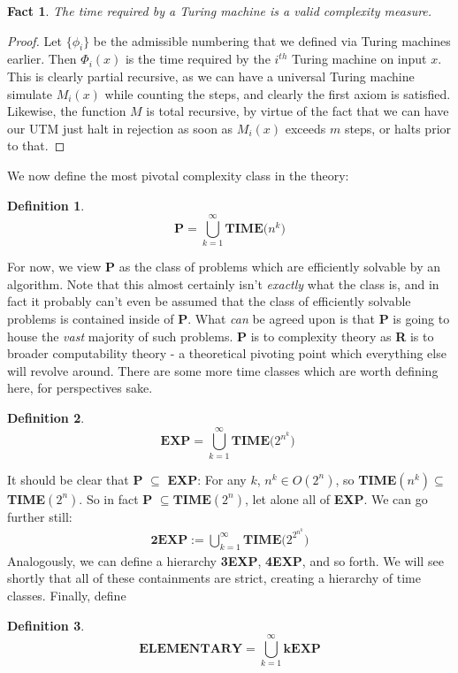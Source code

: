 \documentclass{article}
\theoremstyle{definition}
\newtheorem{definition}{Definition}[section]
\theoremstyle{plain}
\theoremstyle{theorem}
\newtheorem{fact}{Fact}[section]
\begin{document}
\begin{fact}
    The time required by a Turing machine is a valid complexity measure.
\end{fact}
\begin{proof}
    Let $\{\phi_i\}$ be the admissible numbering that we defined via Turing machines earlier. Then $\Phi_i(x)$ is the time required by the $i^{th}$ Turing machine on input $x$. This is clearly partial recursive, as we can have a universal Turing machine simulate $M_i(x)$ while counting the steps, and clearly the first axiom is satisfied. Likewise, the function $M$ is total recursive, by virtue of the fact that we can have our UTM just halt in rejection as soon as $M_i(x)$ exceeds $m$ steps, or halts prior to that.
\end{proof}
We now define the most pivotal complexity class in the theory:
\begin{definition}
\[ \textbf{P} = \bigcup_{k=1}^\infty \textbf{TIME($n^k$)} \]
\end{definition}
For now, we view \textbf{P} as the class of problems which are efficiently solvable by an algorithm. Note that this almost certainly isn't \textit{exactly} what the class is, and in fact it probably can't even be assumed that the class of efficiently solvable problems is contained inside of \textbf{P}. What \textit{can} be agreed upon is that \textbf{P} is going to house the \textit{vast} majority of such problems. \textbf{P} is to complexity theory as \textbf{R} is to broader computability theory - a theoretical pivoting point which everything else will revolve around. There are some more time classes which are worth defining here, for perspectives sake. 
\begin{definition}
\[ \textbf{EXP} =  \bigcup_{k=1}^\infty \textbf{TIME($2^{n^k}$) } \]
\end{definition}
It should be clear that \textbf{P} $\subseteq$ \textbf{EXP}: For any $k$, $n^k \in O(2^n)$, so \textbf{TIME}$(n^k) \subseteq $\textbf{TIME}$(2^n)$. So in fact \textbf{P} $\subseteq \textbf{TIME}(2^n)$, let alone all of \textbf{EXP}. 
We can go further still:
\begin{align}
    \textbf{2EXP} := \bigcup_{k=1}^{\infty} \textbf{TIME($2^{2^{n^k}}$)}
\end{align}
Analogously, we can define a hierarchy \textbf{3EXP}, \textbf{4EXP}, and so forth. We will see shortly that all of these containments are strict, creating a hierarchy of time classes. Finally, define
\begin{definition}
    \[ \textbf{ELEMENTARY} = \bigcup_{k=1}^{\infty}\textbf{kEXP} \]
\end{definition}
\end{document}
